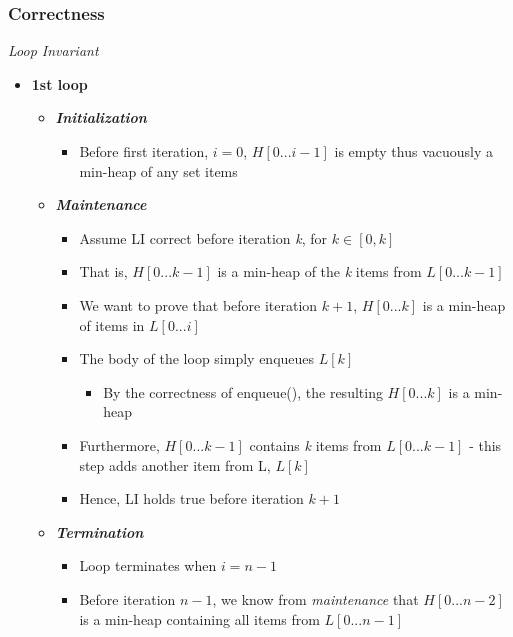 \documentclass[10pt, 
a4paper, 
oneside, 
headinclude, footinclude, 
BCOR5mm]
{scrartcl}
\begin{document}
\subsubsection{Correctness}
\begin{definition}
    \textit{Loop Invariant}
    \begin{itemize}
        \item \textbf{1st loop}
        \begin{itemize}
            \item \textit{\textbf{Initialization}}
            \begin{itemize}
                \item Before first iteration, $i=0$, $H[0...i-1]$ is empty thus vacuously a min-heap of any set items
            \end{itemize}
            \item \textit{\textbf{Maintenance}}
            \begin{itemize}
                \item Assume LI correct before iteration \textit{k}, for $k\in[0,k]$
                \item That is, $H[0...k-1]$ is a min-heap of the \textit{k} items from $L[0...k-1]$
                \item We want to prove that before iteration $k+1$, $H[0...k]$ is a min-heap of items in $L[0...i]$ 
                \item The body of the loop simply enqueues $L[k]$
                \begin{itemize}
                    \item By the correctness of enqueue(), the resulting $H[0...k]$ is a min-heap
                \end{itemize}
                \item Furthermore, $H[0...k-1]$ contains \textit{k} items from $L[0...k-1]$ - this step adds another item from L, $L[k]$
                \item Hence, LI holds true before iteration $k+1$
            \end{itemize}
            \item \textit{\textbf{Termination}}
            \begin{itemize}
                \item Loop terminates when $i=n-1$
                \item Before iteration $n-1$, we know from \textit{maintenance} that $H[0...n-2]$ is a min-heap containing all items from $L[0...n-1]$

\end{itemize}
\end{itemize}
\end{itemize}
\end{definition}
\end{document}
